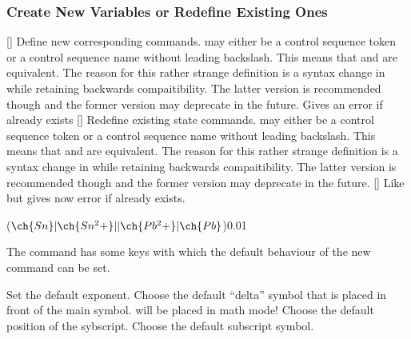 \documentclass[load-preamble+]{cnltx-doc}
\begin{document}
\subsubsection{Create New Variables or Redefine Existing Ones}\label{sec:create-new-variables}

\begin{commands}
  []
    Define new corresponding commands.   may
    either be a control sequence token or a control sequence name without
    leading backslash.  This means that  and
     are equivalent.  The reason for
    this rather strange definition is a syntax change in 
    while retaining backwards compaitibility. The latter version is
    recommended though and the former version may deprecate in the future.
    Gives an error if  already exists
  []
    Redefine existing state commands.   may either be a control
    sequence token or a control sequence name without leading backslash.
    This means that  and
     are equivalent.  The reason for
    this rather strange definition is a syntax change in 
    while retaining backwards compaitibility. The latter version is
    recommended though and the former version may deprecate in the future.
  []
    Like  but gives now error if
     already exists.
\end{commands}

\begin{example}
  \NewChemState{}
  \NewChemState{}
   \par
   \par
  \ElPot[exponent=0]($\ch{Sn}|\ch{Sn^2+}||\ch{Pb^2+}|\ch{Pb}$){0.01}
\end{example}

The command has some keys with which the default behaviour of the new command
can be set.
\begin{options}
    Set the default exponent.
    Choose the default ``delta'' symbol that is placed in front of the
    main symbol.   will be placed in math mode!
    Choose the default position of the sybscript.
  \Default
    Choose the default subscript symbol.
\end{options}
\end{document}
